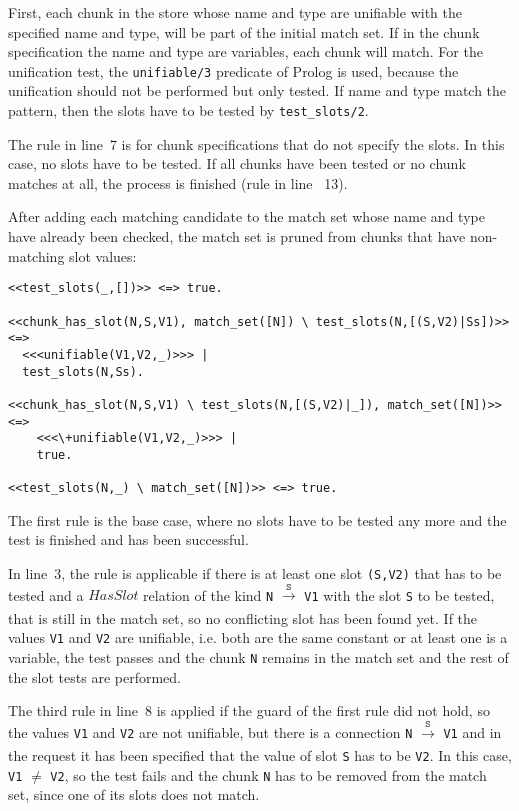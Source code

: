 First, each chunk in the store whose name and type are unifiable with the specified name and type, will be part of the initial match set. If in the chunk specification the name and type are variables, each chunk will match. For the unification test, the \lstinline|unifiable/3| predicate of Prolog is used, because the unification should not be performed but only tested. If name and type match the pattern, then the slots have to be tested by \lstinline|test_slots/2|.

The rule in line~7 is for chunk specifications that do not specify the slots. In this case, no slots have to be tested. If all chunks have been tested or no chunk matches at all, the process is finished (rule in line ~13).

 After adding each matching candidate to the match set whose name and type have already been checked, the match set is pruned from chunks that have non-matching slot values:

\begin{lstlisting}
<<test_slots(_,[])>> <=> true.

<<chunk_has_slot(N,S,V1), match_set([N]) \ test_slots(N,[(S,V2)|Ss])>> <=> 
  <<<unifiable(V1,V2,_)>>> | 
  test_slots(N,Ss).

<<chunk_has_slot(N,S,V1) \ test_slots(N,[(S,V2)|_]), match_set([N])>> <=> 
    <<<\+unifiable(V1,V2,_)>>> | 
    true.
    
<<test_slots(N,_) \ match_set([N])>> <=> true.
\end{lstlisting}


The first rule is the base case, where no slots have to be tested any more and the test is finished and has been successful.

In line~3, the rule is applicable if there is at least one slot \lstinline|(S,V2)| that has to be tested and a $HasSlot$ relation of the kind \lstinline|N| $\xrightarrow[]{\mathtt{S}}$ \lstinline|V1| with the slot \lstinline|S| to be tested, that is still in the match set, so no conflicting slot has been found yet. If the values \lstinline|V1| and \lstinline|V2| are unifiable, i.e. both are the same constant or at least one is a variable, the test passes and the chunk \lstinline|N| remains in the match set and the rest of the slot tests are performed.

 The third rule in line~8 is applied if the guard of the first rule did not hold, so the values \lstinline|V1| and \lstinline|V2| are not unifiable, but there is a connection \lstinline|N| $\xrightarrow[]{\mathtt{S}}$ \lstinline|V1| and in the request it has been specified that the value of slot \lstinline|S| has to be \lstinline|V2|. In this case, \lstinline|V1| $\neq$ \lstinline|V2|, so the test fails and the chunk \lstinline|N| has to be removed from the match set, since one of its slots does not match.

